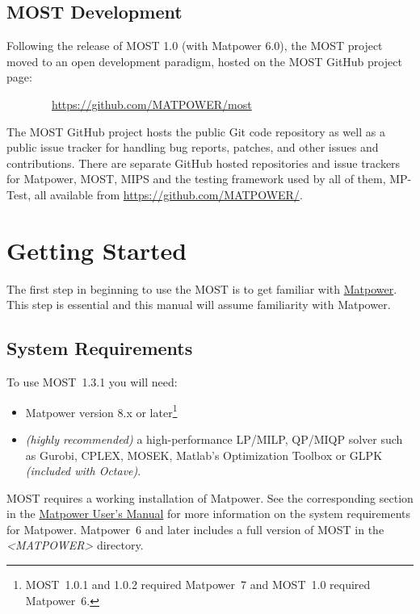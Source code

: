 \documentclass[12pt]{article}
\newcommand{\mpver}[0]{8.1}
\newcommand{\matlab}[0]{{\sc Matlab}}
\newcommand{\matpower}[0]{{\sc Matpower}}
\newcommand{\matpowerurl}[0]{https://matpower.org}
\newcommand{\matpowerlink}[0]{\href{\matpowerurl}{\matpower{}}}
\newcommand{\mptest}[0]{{MP-Test}}
\newcommand{\mips}[0]{{MIPS}}
\newcommand{\most}[0]{{MOST}}
\newcommand{\mosturl}[0]{https://github.com/MATPOWER/most}
\newcommand{\mostver}[0]{1.3.1}
\newcommand{\cplex}[0]{{CPLEX}}
\newcommand{\glpk}[0]{{GLPK}}
\newcommand{\gurobi}[0]{{Gurobi}}
\newcommand{\mosek}[0]{{MOSEK}}
\newcommand{\ot}[0]{{Optimization Toolbox}}
\newcommand{\code}[1]{{\relsize{-0.5}{\tt{{#1}}}}}  %
\newcommand{\mppath}[1]{\textsf{\textsl{{\relsize{-1.0}\textless{}\mbox{MATPOWER}\textgreater{}}}}\code{{#1}}}  %
\newcommand{\mostpath}[1]{\mppath{}\code{/most{#1}}}
\newcommand{\mumurl}[0]{https://matpower.org/docs/MATPOWER-manual-\mpver.pdf}
\newcommand{\mum}[0]{\href{\mumurl}{\matpower{} User's Manual}}
\numberwithin{equation}{section}
\numberwithin{table}{section}
\numberwithin{figure}{section}
\begin{document}
\subsection{\most{} Development}
\label{sec:development}

Following the release of \most{} 1.0 (with \matpower{} 6.0), the \most{} project moved to an open development paradigm, hosted on the \most{} GitHub project page:

\bigskip

~~~~~~~~\url{\mosturl}

\bigskip

The \most{} GitHub project hosts the public Git code repository as well as a public issue tracker for handling bug reports, patches, and other issues and contributions. There are separate GitHub hosted repositories and issue trackers for \matpower{}, \most{}, \mips{} and the testing framework used by all of them, \mptest{}, all available from \url{https://github.com/MATPOWER/}.


\clearpage
\section{Getting Started}

The first step in beginning to use the \most{} is to get familiar with \matpowerlink{}. This step is essential and this manual will assume familiarity with \matpower{}.

\subsection{System Requirements}
\label{sec:sysreq}
To use \most{}~\mostver{} you will need:
\begin{itemize}
\item \matpower{} version 8.x or later\footnote{\most{}~1.0.1 and 1.0.2 required \matpower{}~7 and \most{}~1.0 required \matpower{}~6.}
\item \emph{(highly recommended)} a high-performance LP/MILP, QP/MIQP solver such as \gurobi{}, \cplex{}, \mosek{}, \matlab{}'s \ot{} or \glpk{} \emph{(included with Octave)}.
\end{itemize}

\most{} requires a working installation of \matpower{}. See the corresponding section in the \mum{} for more information on the system requirements for \matpower{}.
\matpower{}~6 and later includes a full version of \most{} in the \mostpath{} directory.
\end{document}
